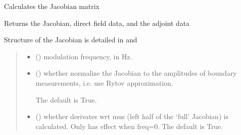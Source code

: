 \documentclass[letterpaper,10pt,english]{sphinxmanual}
\begin{document}
\begin{fulllineitems}
\begin{fulllineitems}
\label{\detokenize{_autosummary/nirfasterff.base.stnd_mesh.stndmesh:nirfasterff.base.stnd_mesh.stndmesh.jacobian}}
\pysigstartsignatures
{}
\pysigstopsignatures
\sphinxAtStartPar
Calculates the Jacobian matrix

\sphinxAtStartPar
Returns the Jacobian, direct field data, and the adjoint data

\sphinxAtStartPar
Structure of the Jacobian is detailed in {\hyperref[\detokenize{_autosummary/nirfasterff.inverse.jacobian_stnd_CW:nirfasterff.inverse.jacobian_stnd_CW}]{}} and {\hyperref[\detokenize{_autosummary/nirfasterff.inverse.jacobian_stnd_FD:nirfasterff.inverse.jacobian_stnd_FD}]{}}
\begin{quote}\begin{description}
\begin{itemize}
\item {} 
\sphinxAtStartPar
{} () \textendash{} modulation frequency, in Hz.

\item {} 
\sphinxAtStartPar
{} (\sphinxstyleliteralemphasis{\sphinxupquote{, }}) \textendash{} 
\sphinxAtStartPar
whether normalize the Jacobian to the amplitudes of boundary measurements, i.e. use Rytov approximation.

\sphinxAtStartPar
The default is True.


\item {} 
\sphinxAtStartPar
{} (\sphinxstyleliteralemphasis{\sphinxupquote{, }}) \textendash{} whether derivates wrt mus (left half of the ‘full’ Jacobian) is calculated. Only has effect when freq=0. The default is True.


\end{itemize}
\end{description}
\end{quote}
\end{fulllineitems}
\end{fulllineitems}
\end{document}
